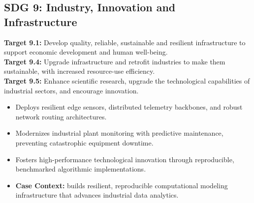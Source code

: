 \subsection{SDG 9: Industry, Innovation and Infrastructure}
\noindent\textbf{Target 9.1:} Develop quality, reliable, sustainable and resilient infrastructure to support economic development and human well-being. \\
\noindent\textbf{Target 9.4:} Upgrade infrastructure and retrofit industries to make them sustainable, with increased resource-use efficiency. \\
\noindent\textbf{Target 9.5:} Enhance scientific research, upgrade the technological capabilities of industrial sectors, and encourage innovation.
\begin{itemize}
  \item Deploys resilient edge sensors, distributed telemetry backbones, and robust network routing architectures.
  \item Modernizes industrial plant monitoring with predictive maintenance, preventing catastrophic equipment downtime.
  \item Fosters high-performance technological innovation through reproducible, benchmarked algorithmic implementations.
  \item \textbf{Case Context:} builds resilient, reproducible computational modeling infrastructure that advances industrial data analytics.
\end{itemize}

